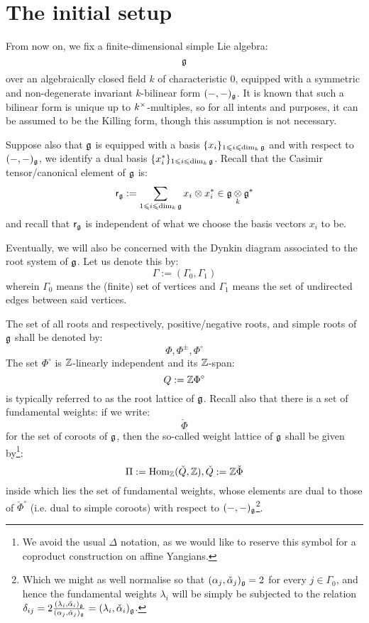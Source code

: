 \section{The initial setup}
    \begin{convention} \label{conv: a_fixed_finite_dimensional_simple_lie_algebra}
        From now on, we fix a finite-dimensional simple Lie algebra:
            $$\mathfrak{g}$$
        over an algebraically closed field $k$ of characteristic $0$, equipped with a symmetric and non-degenerate invariant $k$-bilinear form $(-, -)_{\mathfrak{g}}$. It is known that such a bilinear form is unique up to $k^{\x}$-multiples, so for all intents and purposes, it can be assumed to be the Killing form, though this assumption is not necessary. 

        Suppose also that $\mathfrak{g}$ is equipped with a basis $\{x_i\}_{1 \leqslant i \leqslant \dim_k \mathfrak{g}}$ and with respect to $(-, -)_{\mathfrak{g}}$, we identify a dual basis $\{x_i^*\}_{1 \leqslant i \leqslant \dim_k \mathfrak{g}}$. Recall that the Casimir tensor/canonical element of $\mathfrak{g}$ is:
            $$\sfr_{\g} := \sum_{1 \leq i \leq \dim_k \g} x_i \tensor x_i^* \in \g \tensor_k \g^*$$
        and recall that $\mathsf{r}_{\mathfrak{g}}$ is independent of what we choose the basis vectors $x_i$ to be.

        Eventually, we will also be concerned with the Dynkin diagram associated to the root system of $\mathfrak{g}$. Let us denote this by:
            $$\Gamma := (\Gamma_0, \Gamma_1)$$
        wherein $\Gamma_0$ means the (finite) set of vertices and $\Gamma_1$ means the set of undirected edges between said vertices. 

        The set of all roots and respectively, positive/negative roots, and simple roots of $\mathfrak{g}$ shall be denoted by:
            $$\Phi, \Phi^{\pm}, \Phi^{\circ}$$
        The set $\Phi^{\circ}$ is $\mathbb{Z}$-linearly independent and its $\mathbb{Z}$-span:
            $$Q := \mathbb{Z} \Phi^{\circ}$$
        is typically referred to as the root lattice of $\mathfrak{g}$. Recall also that there is a set of fundamental weights: if we write:
            $$\check{\Phi}$$
        for the set of coroots of $\mathfrak{g}$, then the so-called weight lattice of $\mathfrak{g}$ shall be given by\footnote{We avoid the usual $\Delta$ notation, as we would like to reserve this symbol for a coproduct construction on affine Yangians.}:
            $$\Pi := \mathrm{Hom}_{\mathbb{Z}}(\check{Q}, \mathbb{Z}), \check{Q} := \mathbb{Z}\check{\Phi}$$
        inside which lies the set of fundamental weights, whose elements are dual to those of $\check{\Phi}^{\circ}$ (i.e. dual to simple coroots) with respect to $(-, -)_{\mathfrak{g}}$\footnote{Which we might as well normalise so that $(\alpha_j, \check{\alpha}_j)_{\mathfrak{g}} = 2$ for every $j \in \Gamma_0$, and hence the fundamental weights $\lambda_i$ will be simply be subjected to the relation $\delta_{ij} = 2 \frac{(\lambda_i, \check{\alpha}_i)_{\mathfrak{g}}}{(\alpha_j, \check{\alpha}_j)_{\mathfrak{g}}} = (\lambda_i, \check{\alpha}_i)_{\mathfrak{g}}$.}.
    \end{convention}

